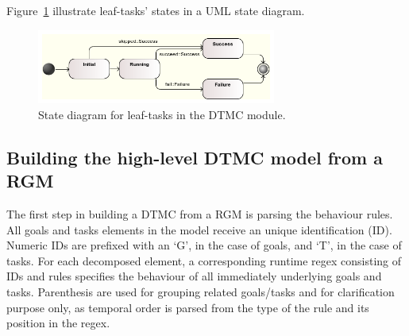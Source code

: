 Figure~\ref{fig:UML_TSK_STATES} illustrate leaf-tasks' states in a UML state diagram.

\begin{figure}[ht]
\centering
\includegraphics[width=0.7\textwidth]{imgs/UML_TSK_STATES.png}
\caption{State diagram for leaf-tasks in the DTMC module.}
\label{fig:UML_TSK_STATES}
\end{figure}



\subsection{Building the high-level DTMC model from a RGM}


The first step in building a DTMC from a RGM is parsing the behaviour rules. All goals and tasks elements in the model receive an unique identification (ID). Numeric IDs are prefixed with an `G', in the case of goals, and `T', in the case of tasks. For each decomposed element, a corresponding runtime regex consisting of IDs and rules specifies the behaviour of all immediately underlying goals and tasks. Parenthesis are used for grouping related goals/tasks and for clarification purpose only, as temporal order is parsed from the type of the rule and its position in the regex.


